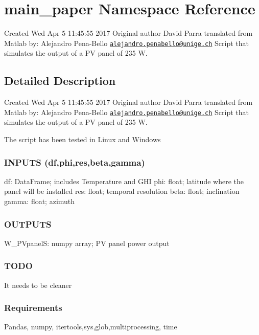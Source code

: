 \hypertarget{namespacemain__paper}{}\section{main\+\_\+paper Namespace Reference}
\label{namespacemain__paper}


Created Wed Apr 5 11\+:45\+:55 2017 Original author David Parra translated from Matlab by\+: Alejandro Pena-\/\+Bello \href{mailto:alejandro.penabello@unige.ch}{\tt alejandro.\+penabello@unige.\+ch} Script that simulates the output of a PV panel of 235 W.  




\subsection{Detailed Description}
Created Wed Apr 5 11\+:45\+:55 2017 Original author David Parra translated from Matlab by\+: Alejandro Pena-\/\+Bello \href{mailto:alejandro.penabello@unige.ch}{\tt alejandro.\+penabello@unige.\+ch} Script that simulates the output of a PV panel of 235 W. 

The script has been tested in Linux and Windows \subsubsection*{I\+N\+P\+U\+TS (df,phi,res,beta,gamma) }

df\+: Data\+Frame; includes Temperature and G\+HI phi\+: float; latitude where the panel will be installed res\+: float; temporal resolution beta\+: float; inclination gamma\+: float; azimuth \subsubsection*{O\+U\+T\+P\+U\+TS }

W\+\_\+\+P\+VpanelS\+: numpy array; PV panel power output \subsubsection*{T\+O\+DO }

It needs to be cleaner \subsubsection*{Requirements }

Pandas, numpy, itertools,sys,glob,multiprocessing, time 
